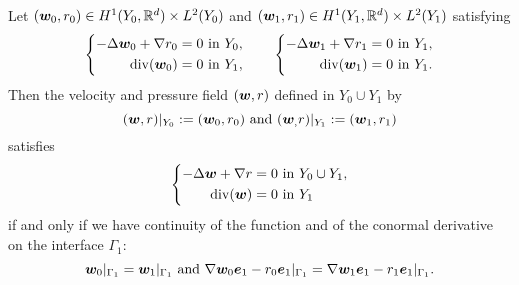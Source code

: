 \documentclass[a4paper,10pt,reqno]{amsart}
\begin{document}
\begin{lemma}
    Let $({\bm w}_0,r_0)\in H^{1}(Y_0,\mathbb{R}^{d})\times L^{2}(Y_0)$ and $({\bm w}_1,r_1)\in
    H^{1}(Y_1,\mathbb{R}^{d})\times L^{2}(Y_1)$ satisfying  
    \begin{equation}
    \label{eqn:he7zb}   
    \left\{\begin{aligned}
            -\Delta {\bm w}_0+\nabla r_0 &=0 \textrm{ in } Y_0,\\  
            \mathrm{div}({\bm w}_0) &= 0\textrm{ in } Y_1,
    \end{aligned}\right. \qquad
    \left\{\begin{aligned}
            -\Delta {\bm w}_1+\nabla r_1 &=0 \textrm{ in } Y_1,\\  
            \mathrm{div}({\bm w}_1) &= 0\textrm{ in } Y_1.
    \end{aligned}\right.
    \end{equation}
    Then the velocity and pressure field $({\bm w},r)$ defined in $Y_0\cup Y_1$ by   
    \begin{equation}
    \label{eqn:topkr}
        ({\bm w},r)|_{Y_0}:=({\bm w}_0,r_0) \text{ and }({\bm w}_,r)|_{Y_1}:=({\bm w}_1,r_1)
    \end{equation}
    satisfies   
    \begin{equation}
    \label{eqn:s9bzn}   
    \left\{\begin{aligned}
            -\Delta {\bm w}+\nabla r&=0\textrm{ in } Y_0\cup Y_1,\\    
            \mathrm{div}({\bm w})& = 0 \textrm{ in } Y_1
    \end{aligned}
    \right.
    \end{equation}
    if and only if we have continuity of the function and of the conormal derivative
    on the interface $\Gamma_1$:
    \begin{equation}
    \label{eqn:8zwjf}
    {\bm w}_0|_{\Gamma_1}={\bm w}_1|_{\Gamma_1} \text{ and
    }\nabla{\bm w}_0{\bm e}_1-r_0{\bm e}_1\vert_{\Gamma_1}=\nabla {\bm w}_1{\bm e}_1-r_1{\bm e}_1\vert_{\Gamma_1}.
    \end{equation}
\end{lemma}
\end{document}
